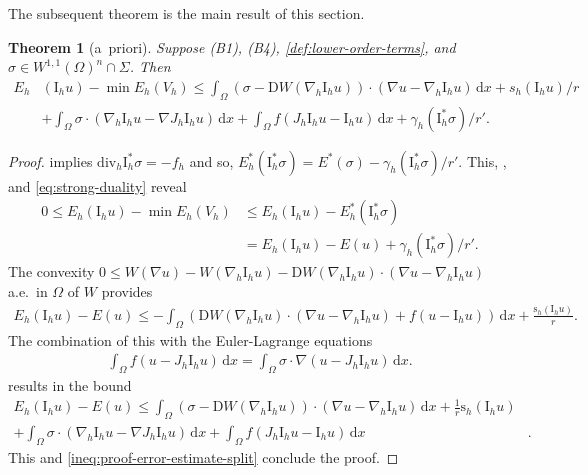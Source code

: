 \documentclass[a4paper]{amsart}
\numberwithin{equation}{section}
\renewcommand{\d}[1]{\,\mathrm{d}#1}
\renewcommand{\div}{\mathrm{div}}
\newcommand{\I}{\mathrm{I}}
\newcommand{\D}{\mathrm{D}}
\newcommand{\s}{\mathrm{s}}
\newtheorem{theorem}{Theorem}[section]
\theoremstyle{remark}
\begin{document}
The subsequent theorem is the main result of this section.

\begin{theorem}[a~priori]\label{thm:error-estimate}
	Suppose (B1), (B4), \eqref{def:lower-order-terms}, and $\sigma \in W^{1,1}(\Omega)^n \cap \Sigma$. Then
	\begin{align*}
		E_h&(\mathrm{I}_h u) - \min E_h(V_h) \leq \int_\Omega (\sigma - \D W(\nabla_h \mathrm{I}_h u)) \cdot (\nabla u - \nabla_h \I_h u) \d{x} + s_h(\I_h u)/r\\
		&+ \int_\Omega \sigma \cdot (\nabla_h \mathrm{I}_h u - \nabla J_h \I_h u) \d{x} + \int_\Omega f (J_h \I_h u - \mathrm{I}_h u) \d{x} + \gamma_h(\mathrm{I}_h^* \sigma)/r'.
	\end{align*}
\end{theorem}

\begin{proof}
 implies $\div_h \mathrm{I}_h^* \sigma = -f_h$ and so,
$E^*_h(\mathrm{I}_h^* \sigma) = E^*(\sigma) - \gamma_h(\mathrm{I}_h^* \sigma)/r'$.
This, , and \eqref{eq:strong-duality} reveal
	\begin{align}\label{ineq:proof-error-estimate-split}
		0 \leq E_h(\mathrm{I}_h u) - \min E_h(V_h) &\leq E_h(\mathrm{I}_h u) - E^*_h(\mathrm{I}_h^* \sigma)\nonumber\\
		&= E_h(\mathrm{I}_h u) - E(u) + \gamma_h(\mathrm{I}_h^* \sigma)/r'.
	\end{align}
    The convexity $0 \leq W(\nabla u) - W(\nabla_h \I_h u) - \D W(\nabla_h \mathrm{I}_h u) \cdot (\nabla u - \nabla_h \I_h u)$ a.e.~in $\Omega$ of $W$ provides
	\begin{align*}
		E_h(\I_h u) - E(u) \leq - \int_\Omega (\D W(\nabla_h \mathrm{I}_h u) \cdot (\nabla u - \nabla_h \I_h u) + f (u - \I_h u)) \d{x} + \frac{\s_h(\I_h u)}{r}.
	\end{align*}
	The combination of this with the Euler-Lagrange equations
	\begin{align*}
		\int_\Omega f (u - J_h \I_h u) \d{x} = \int_\Omega \sigma \cdot \nabla (u - J_h \I_h u) \d{x}.
	\end{align*}
results in the bound
	\begin{align}\label{ineq:proof-convergence-rates-primal}
		E_h(\I_h u) - E(u) \leq \int_\Omega (\sigma - \D W(\nabla_h \I_h u)) \cdot (\nabla u - \nabla_h \I_h u) \d{x} + \frac{1}{r}\s_h(\I_h u)&\nonumber\\
		+ \int_\Omega \sigma \cdot (\nabla_h \I_h u - \nabla J_h \I_h u) \d{x} + \int_\Omega f (J_h \I_h u - \mathrm{I}_h u) \d{x}&.
	\end{align}
	This and \eqref{ineq:proof-error-estimate-split} conclude the proof.
\end{proof}
\end{document}
